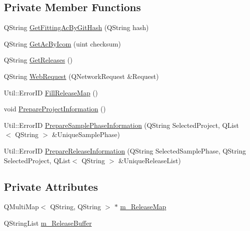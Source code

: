 \subsection*{Private Member Functions}
\begin{DoxyCompactItemize}
\item 
Q\+String \hyperlink{class_r_w_1_1_c_o_r_e_1_1_flash_informations_a54a1ad5f711dd80d570e1d93ae205bd3}{Get\+Fitting\+Ac\+By\+Git\+Hash} (Q\+String hash)
\item 
Q\+String \hyperlink{class_r_w_1_1_c_o_r_e_1_1_flash_informations_a55b9f9803354a19f3f43e21590389a64}{Get\+Ac\+By\+Icom} (uint checksum)
\item 
Q\+String \hyperlink{class_r_w_1_1_c_o_r_e_1_1_flash_informations_a3821e59e8bab2cbef251fc05fa070811}{Get\+Releases} ()
\item 
Q\+String \hyperlink{class_r_w_1_1_c_o_r_e_1_1_flash_informations_a1584d6557b93628bc86db88af13d0d4b}{Web\+Request} (Q\+Network\+Request \&Request)
\item 
Util\+::\+Error\+ID \hyperlink{class_r_w_1_1_c_o_r_e_1_1_flash_informations_a80c0651369e180838543d0f125aa56ef}{Fill\+Release\+Map} ()
\item 
void \hyperlink{class_r_w_1_1_c_o_r_e_1_1_flash_informations_aa637abd5665ab3253c28b2f56552df4a}{Prepare\+Project\+Information} ()
\item 
Util\+::\+Error\+ID \hyperlink{class_r_w_1_1_c_o_r_e_1_1_flash_informations_acfe7f2e69b85b4a62b7dff2bd2131049}{Prepare\+Sample\+Phase\+Information} (Q\+String Selected\+Project, Q\+List$<$ Q\+String $>$ \&Unique\+Sample\+Phase)
\item 
Util\+::\+Error\+ID \hyperlink{class_r_w_1_1_c_o_r_e_1_1_flash_informations_a02e53be6cd2fddc476129dde406ca241}{Prepare\+Release\+Information} (Q\+String Selected\+Sample\+Phase, Q\+String Selected\+Project, Q\+List$<$ Q\+String $>$ \&Unique\+Release\+List)
\end{DoxyCompactItemize}
\subsection*{Private Attributes}
\begin{DoxyCompactItemize}
\item 
Q\+Multi\+Map$<$ Q\+String, Q\+String $>$ $\ast$ \hyperlink{class_r_w_1_1_c_o_r_e_1_1_flash_informations_a710529bd946b8189fae80e14c1c74599}{m\+\_\+\+Release\+Map}
\item 
Q\+String\+List \hyperlink{class_r_w_1_1_c_o_r_e_1_1_flash_informations_a03b8c748a630e47e5310ba4bbd8bd3fa}{m\+\_\+\+Release\+Buffer}
\end{DoxyCompactItemize}


